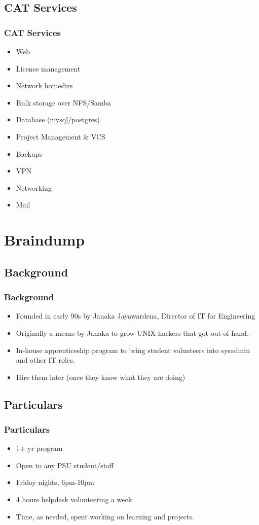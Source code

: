 \documentclass{beamer}
\begin{document}
\subsection{CAT Services}
\frame
{
    \frametitle{CAT Services}
    \begin{itemize}
        \item Web
        \item License management
        \item Network homedirs
        \item Bulk storage over NFS/Samba
        \item Database (mysql/postgres)
        \item Project Management \& VCS
        \item Backups
        \item VPN
        \item Networking
        \item Mail
    \end{itemize}

}

\section{Braindump}
\subsection{Background}
\frame
{
    \frametitle{Background}
    \begin{itemize}
        \item Founded in early 90s by Janaka Jayawardena, Director of IT for Engineering
        \item Originally a means by Janaka to grow UNIX hackers that got out of hand.
        \item In-house apprenticeship program to bring student volunteers into sysadmin and other IT roles.
        \item Hire them later (once they know what they are doing)
    \end{itemize}
}

\subsection{Particulars}
\frame
{
    \frametitle{Particulars}
    \begin{itemize}
        \item 1+ yr program
        \item Open to any PSU student/staff
        \item Friday nights, 6pm-10pm
        \item 4 hours helpdesk volunteering a week
        \item Time, as needed, spent working on learning and projects.
    \end{itemize}
}
\end{document}
